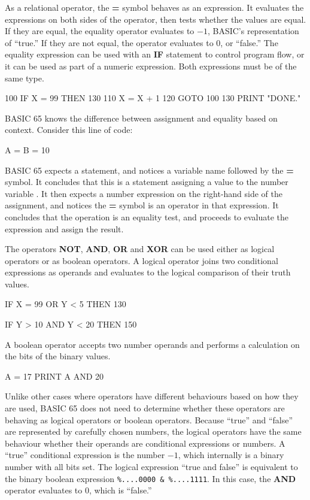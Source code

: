 As a relational operator, the {\bf =} symbol behaves as an expression. It evaluates the expressions on both sides of the operator, then tests whether the values are equal. If they are equal, the equality operator evaluates to $-1$, BASIC's representation of ``true.'' If they are not equal, the operator evaluates to 0, or ``false.'' The equality expression can be used with an {\bf IF} statement to control program flow, or it can be used as part of a numeric expression. Both expressions must be of the same type.

\begin{screencode}
100 IF X = 99 THEN 130
110 X = X + 1
120 GOTO 100
130 PRINT "DONE."
\end{screencode}

BASIC 65 knows the difference between assignment and equality based on context. Consider this line of code:

\begin{screencode}
A = B = 10
\end{screencode}

BASIC 65 expects a statement, and notices a variable name followed by the {\bf =} symbol. It concludes that this is a statement assigning a value to the number variable . It then expects a number expression on the right-hand side of the assignment, and notices the {\bf =} symbol is an operator in that expression. It concludes that the operation is an equality test, and proceeds to evaluate the expression and assign the result.

The operators {\bf NOT}, {\bf AND}, {\bf OR} and {\bf XOR} can be used either as logical operators or as boolean operators. A logical operator joins two conditional expressions as operands and evaluates to the logical comparison of their truth values.

\begin{screencode}
IF X = 99 OR Y < 5 THEN 130

IF Y > 10 AND Y < 20 THEN 150
\end{screencode}

A boolean operator accepts two number operands and performs a calculation on the bits of the binary values.

\begin{screencode}
A = 17
PRINT A AND 20
\end{screencode}

Unlike other cases where operators have different behaviours based on how they are used, BASIC 65 does not need to determine whether these operators are behaving as logical operators or boolean operators. Because ``true'' and ``false'' are represented by carefully chosen numbers, the logical operators have the same behaviour whether their operands are conditional expressions or numbers. A ``true'' conditional expression is the number $-1$, which internally is a binary number with all bits set. The logical expression ``true and false'' is equivalent to the binary boolean expression {\tt \%....0000 \& \%....1111}. In this case, the {\bf AND} operator evaluates to 0, which is ``false.''

